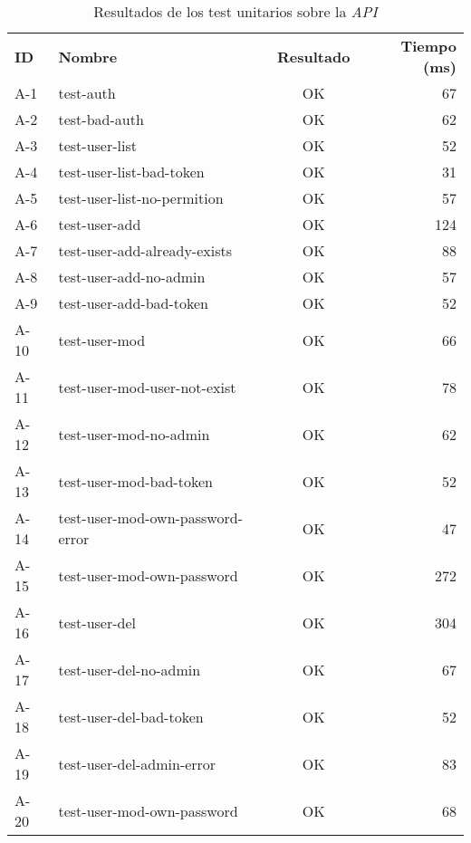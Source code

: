 \begin{table}\small
	\centering
	\begin{center}	
		\begin{tabular}{llcr}
			\toprule 
			\textbf{ID} & \textbf{Nombre} & \textbf{Resultado} & \textbf{Tiempo (ms)} \\ 
			\otoprule
			A-1 & test-auth & OK & 67 \\ 
			 
			A-2 & test-bad-auth & OK & 62 \\ 
			 
			A-3 & test-user-list & OK & 52 \\ 
			 
			A-4 & test-user-list-bad-token & OK & 31 \\ 
			 
			A-5 & test-user-list-no-permition & OK & 57 \\ 
			 
			A-6 & test-user-add & OK & 124 \\ 
			 
			A-7 & test-user-add-already-exists & OK & 88 \\ 
			 
			A-8 & test-user-add-no-admin & OK & 57\\ 
			 
			A-9 & test-user-add-bad-token & OK & 52\\ 
			 
			A-10 & test-user-mod & OK &  66\\ 
			 
			A-11 & test-user-mod-user-not-exist & OK & 78 \\ 
			 
			A-12 & test-user-mod-no-admin & OK & 62 \\ 
			 
			A-13 & test-user-mod-bad-token & OK & 52 \\ 
			 
			A-14 & test-user-mod-own-password-error & OK & 47 \\ 
			 
			A-15 & test-user-mod-own-password & OK & 272 \\ 
			 
			A-16 & test-user-del & OK & 304 \\ 
			 
			A-17 & test-user-del-no-admin & OK & 67 \\ 
			 
			A-18 & test-user-del-bad-token & OK & 52 \\ 
			 
			A-19 & test-user-del-admin-error & OK & 83 \\ 
			 
			A-20 & test-user-mod-own-password & OK & 68 \\ 
			\bottomrule
		\end{tabular} 
	\end{center}
	\caption{Resultados de los test unitarios sobre la \textit{API}}
	\label{tab:test_api}
\end{table}

